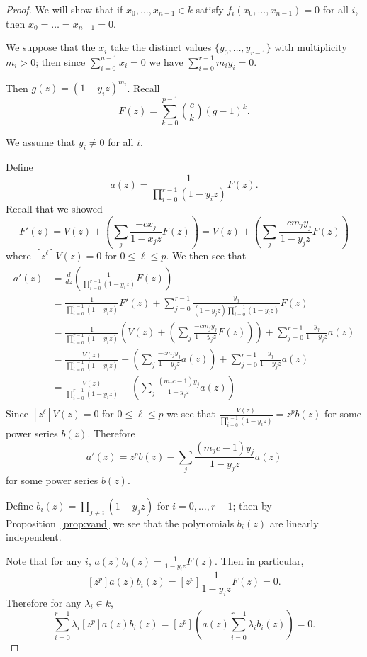 \documentclass{article}
\numberwithin{equation}{section}
\begin{document}
\begin{proof} 

We will show that if $x_0,\dots,x_{n-1} \in k$ satisfy $f_i(x_0,\dots,x_{n-1})=0$ for all $i$, then $x_0=\dots=x_{n-1}=0$. 



We suppose that the $x_i$ take the distinct values $\{y_0,\dots,y_{r-1}\}$ with multiplicity $m_i>0$; then since $\sum_{i=0}^{n-1} x_i=0$ we have $\sum_{i=0}^{r-1} m_iy_i=0$. 

Then $g(z)=(1-y_iz)^{m_i}$. Recall $$F(z)=\sum_{k=0}^{p-1} \binom{c}{k}(g-1)^k.$$

We assume that $y_i \ne 0$ for all $i$.

Define $$a(z)=\frac{1}{\prod_{i=0}^{r-1}(1-y_iz)}F(z).$$ Recall that we showed $$F'(z)=V(z)+\left(\sum_j \frac{-cx_j}{1-x_jz}F(z)\right)=V(z)+\left(\sum_j \frac{-cm_jy_j}{1-y_jz}F(z)\right)$$ where $[z^\ell]V(z)=0$ for $0 \le \ell \le p$. We then see that
\begin{align*}
a'(z)&=\frac{d}{dz}\left(\frac{1}{\prod_{i=0}^{r-1}(1-y_iz)}F(z)\right)\\
&=\frac{1}{\prod_{i=0}^{r-1}(1-y_iz)}F'(z)+\sum_{j=0}^{r-1}\frac{y_j}{(1-y_jz)\prod_{i=0}^{r-1}(1-y_iz)}F(z)\\
&=\frac{1}{\prod_{i=0}^{r-1}(1-y_iz)}\left(V(z)+\left(\sum_j \frac{-cm_jy_j}{1-y_jz}F(z)\right)\right)+\sum_{j=0}^{r-1}\frac{y_j}{1-y_jz}a(z)\\
&=\frac{V(z)}{\prod_{i=0}^{r-1}(1-y_iz)}+\left(\sum_j \frac{-cm_jy_j}{1-y_jz}a(z)\right)+\sum_{j=0}^{r-1}\frac{y_j}{1-y_jz}a(z)\\
&=\frac{V(z)}{\prod_{i=0}^{r-1}(1-y_iz)}-\left(\sum_j \frac{(m_jc-1)y_j}{1-y_jz}a(z)\right)\\\end{align*}
Since $[z^\ell]V(z)=0$ for $0 \le \ell \le p$ we see that $\frac{V(z)}{\prod_{i=0}^{r-1}(1-y_iz)}=z^pb(z)$ for some power series $b(z)$. Therefore $$a'(z)=z^pb(z)-\sum_j \frac{(m_jc-1)y_j}{1-y_jz}a(z)$$ for some power series $b(z)$.

Define $b_i(z)=\prod_{j \ne i} (1-y_jz)$ for $i=0,\dots,r-1$; then by Proposition~\ref{prop:vand} we see that the polynomials $b_i(z)$ are linearly independent. 

Note that for any $i$, $a(z)b_i(z)=\frac{1}{1-y_iz}F(z)$. Then in particular, $$[z^p]a(z)b_i(z)=[z^p]\frac{1}{1-y_iz}F(z)=0.$$ Therefore for any $\lambda_i \in k$, \begin{equation}\label{eq:lincomb}\sum_{i=0}^{r-1} \lambda_i[z^p]a(z)b_i(z)=[z^p]\left( a(z)\sum_{i=0}^{r-1}\lambda_ib_i(z)\right)=0.\end{equation}


\end{proof}
\end{document}
